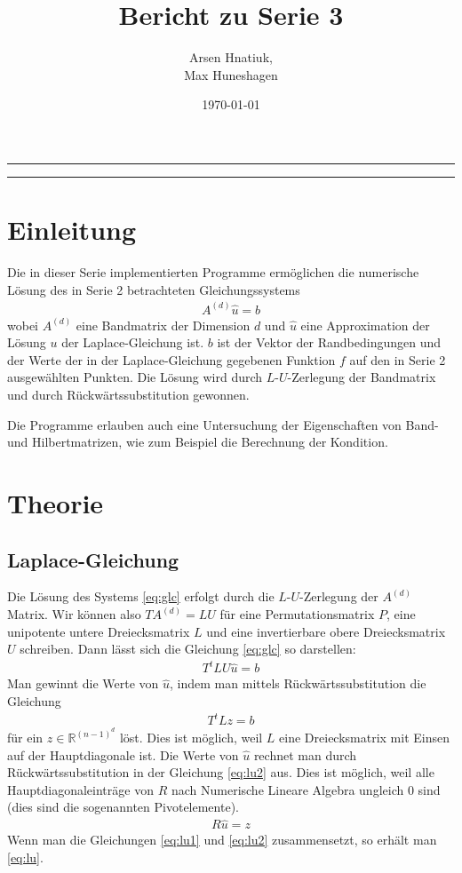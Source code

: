 \documentclass[smallheadings]{scrartcl}
\title{Bericht zu Serie 3}
\author{%
  Arsen Hnatiuk,\\%
  Max Huneshagen 
}
\date{\today}
\numberwithin{equation}{section}
\begin{document}
\maketitle
\tableofcontents
\bigskip

\hrule
\hrule


\section{Einleitung}

Die in dieser Serie implementierten Programme ermöglichen die numerische Lösung des in Serie 2 betrachteten Gleichungssystems
\begin{align}
A^{(d)}\hat{u} = b
\label{eq:glc}
\end{align}
wobei $A^{(d)}$ eine Bandmatrix der Dimension $d$ und $\hat{u}$ eine Approximation der Lösung $u$ der Laplace-Gleichung ist. $b$ ist der Vektor der Randbedingungen und der Werte der in der Laplace-Gleichung gegebenen Funktion $f$ auf den in Serie 2 ausgewählten Punkten. Die Lösung wird durch $L$-$U$-Zerlegung der Bandmatrix und durch Rückwärtssubstitution gewonnen.

Die Programme erlauben auch eine Untersuchung der Eigenschaften von Band- und Hilbertmatrizen, wie zum Beispiel die Berechnung der Kondition.

\section{Theorie}

\subsection{Laplace-Gleichung}
Die Lösung des Systems \ref{eq:glc} erfolgt durch die $L$-$U$-Zerlegung der $A^{(d)}$ Matrix. Wir können also $TA^{(d)}=LU$ für eine Permutationsmatrix $P$, eine unipotente untere Dreiecksmatrix $L$ und eine invertierbare obere Dreiecksmatrix $U$ schreiben. Dann lässt sich die Gleichung \ref{eq:glc} so darstellen:
\begin{align}
	T^tLU\hat{u}=b
	\label{eq:lu}
\end{align}
Man gewinnt die Werte von $\hat{u}$, indem man mittels Rückwärtssubstitution die Gleichung 
\begin{align}
	T^tLz=b
	\label{eq:lu1}
\end{align}
für ein $z\in \mathbb{R}^{(n-1)^d}$ löst. Dies ist möglich, weil $L$ eine Dreiecksmatrix mit Einsen auf der Hauptdiagonale ist. Die Werte von $\hat{u}$ rechnet man durch Rückwärtssubstitution in der Gleichung \eqref{eq:lu2} aus. Dies ist möglich, weil alle Hauptdiagonaleinträge von $R$ nach Numerische Lineare Algebra ungleich $0$ sind (dies sind die sogenannten Pivotelemente).
\begin{align}
	R\hat{u}=z
	\label{eq:lu2}
\end{align}
Wenn man die Gleichungen \eqref{eq:lu1} und \eqref{eq:lu2} zusammensetzt, so erhält man \eqref{eq:lu}.
\end{document}
